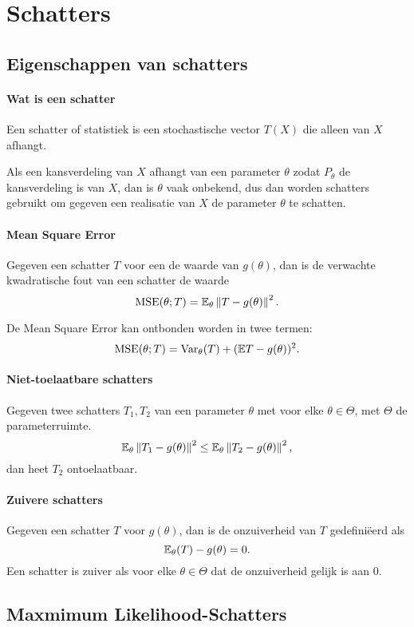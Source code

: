 \section{Schatters}
\subsection{Eigenschappen van schatters}
\paragraph{Wat is een schatter} Een schatter of statistiek is een stochastische vector \(T(X)\) die alleen van \(X\) afhangt.

Als een kansverdeling van \(X\) afhangt van een parameter \(\theta\) zodat \(P_{\theta}\) de kansverdeling is van \(X\), dan is \(\theta\) vaak onbekend, dus dan worden schatters gebruikt om gegeven een realisatie van \(X\) de parameter \(\theta\) te schatten.

\paragraph{Mean Square Error} Gegeven een schatter \(T\) voor een de waarde van \(g(\theta)\), dan is de verwachte kwadratische fout van een schatter de waarde
\[
    \operatorname{MSE}(\theta;T)=\mathbb{E}_{\theta}\left\|T-g(\theta)\right\|^{2}.
\]

De Mean Square Error kan ontbonden worden in twee termen:
\[
    \operatorname{MSE}(\theta;T)=\operatorname{Var}_{\theta}(T)+(\mathbb{E} T-g(\theta))^{2}.
\]

\paragraph{Niet-toelaatbare schatters} Gegeven twee schatters \(T_{1},T_{2}\) van een parameter \(\theta\) met voor elke \(\theta\in\Theta\), met \(\Theta\) de parameterruimte.
\[
    \mathbb{E}_{\theta}\left\|T_{1}-g(\theta)\right\|^{2}\leq\mathbb{E}_{\theta}\left\|T_{2}-g(\theta)\right\|^{2},
\]
dan heet \(T_{2}\) ontoelaatbaar.

\paragraph{Zuivere schatters} Gegeven een schatter \(T\) voor \(g(\theta)\), dan is de onzuiverheid van \(T\) gedefiniëerd als
\[
    \mathbb{E}_{\theta}(T)-g(\theta)=0.
\]
Een schatter is zuiver als voor elke \(\theta\in\Theta\) dat de onzuiverheid gelijk is aan \(0\).

\subsection{Maxmimum Likelihood-Schatters}
